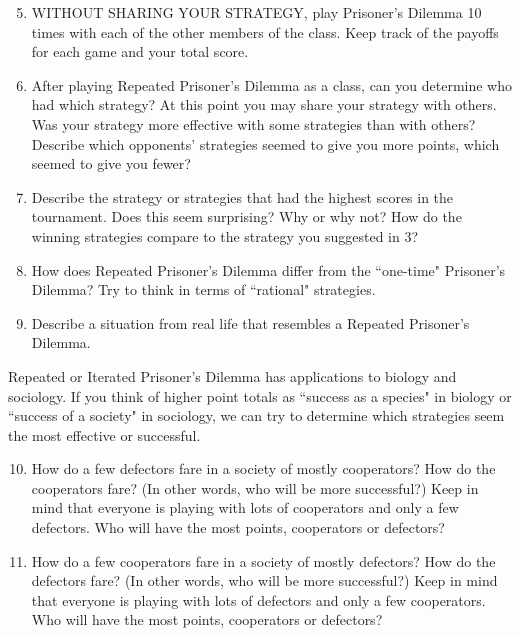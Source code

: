 \begin{itemize}
\begin{enumerate}
\setcounter{enumi}{4}

\item WITHOUT SHARING YOUR STRATEGY, play Prisoner's Dilemma 10 times with each of the other members of the class. Keep track of the payoffs for each game and your total score.

\item After playing Repeated Prisoner's Dilemma as a class, can you determine who had which strategy? At this point you may share your strategy with others. Was your strategy more effective with some strategies than with others? Describe which opponents' strategies seemed to give you more points, which seemed to give you fewer?

\item Describe the strategy or strategies that had the highest scores in the tournament. Does this seem surprising? Why or why not? How do the winning strategies compare to the strategy you suggested in 3?

\item How does Repeated Prisoner's Dilemma differ from the ``one-time" Prisoner's Dilemma? Try to think in terms of ``rational" strategies.

\item Describe a situation from real life that resembles a Repeated Prisoner's Dilemma. 
\end{enumerate}

Repeated or Iterated Prisoner's Dilemma has applications to biology and sociology. If you think of higher point totals as ``success as a species" in biology or ``success of a society" in sociology, we can try to determine which strategies seem the most effective or successful.

\begin{enumerate}
\setcounter{enumi}{9}

\item How do a few defectors fare in a society of mostly cooperators? How do the cooperators fare?  (In other words, who will be more successful?) Keep in mind that everyone is playing with lots of cooperators and only a few defectors. Who will have the most points, cooperators or defectors?

\item How do a few cooperators fare in a society of mostly defectors? How do the defectors fare? (In other words, who will be more successful?) Keep in mind that everyone is playing with lots of defectors and only a few cooperators. Who will have the most points, cooperators or defectors?


\end{enumerate}
\end{itemize}

